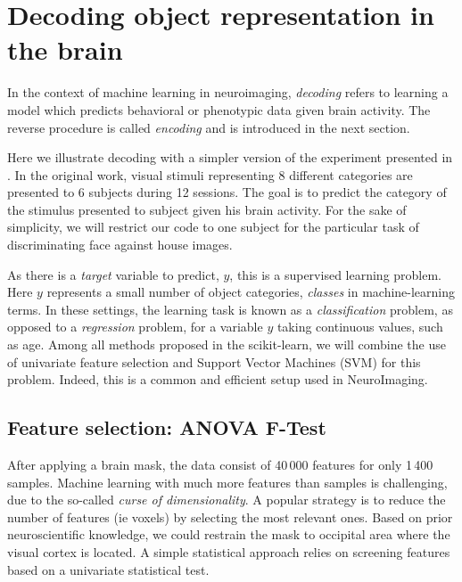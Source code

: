 \documentclass{frontiersSCNS} %
\begin{document}

\section{Decoding object representation in the brain}

In the context of machine learning in neuroimaging, \textit{decoding} refers to learning a model
which predicts behavioral or phenotypic data given brain activity. 
The reverse procedure is
called \textit{encoding} \citep{naselaris2011} and is introduced in the next 
section.

Here we illustrate decoding with a simpler version of the experiment presented in
\cite{haxby2001}. In the original work, visual stimuli representing 8 different categories
are presented to 6 subjects during 12 sessions. The goal is to 
predict the category of the stimulus presented to subject given his
brain activity. For the sake of simplicity, we will restrict our code 
to one subject for the
particular task of discriminating face against house images.

As there is a \emph{target} variable to predict, $y$, this is a supervised
learning problem. Here $y$ represents a small number of object categories,
\emph{classes} in machine-learning terms. In these settings, the learning
task is known as a \emph{classification} problem, as opposed to a
\emph{regression} problem, for a variable $y$ taking continuous values,
such as age.
Among all methods proposed in the scikit-learn, we will
combine the use of univariate feature selection and Support Vector
Machines (SVM) for this problem. Indeed, this is a common and efficient
setup used in NeuroImaging.

\subsection{Feature selection: ANOVA F-Test}

After applying a brain mask, the data consist of 40\,000 features for 
only 1\,400 samples. Machine learning with much more features than samples
is challenging, due to the so-called \emph{curse of dimensionality}.
A popular strategy is to reduce the number of features (ie voxels) by
selecting the most relevant ones. Based on prior neuroscientific
knowledge, we could restrain the mask to occipital area where the visual
cortex is located. A simple statistical approach relies on screening
features based on a univariate statistical test.
\end{document}
